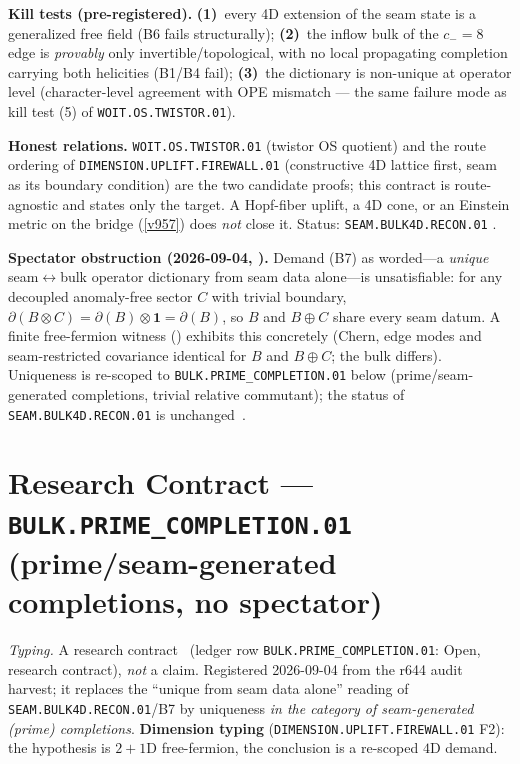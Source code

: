 \documentclass[11pt,a4paper]{article}
\begin{document}
\par\smallskip\noindent\textbf{Kill tests (pre-registered).}
\textbf{(1)}~every 4D extension of the seam state is a generalized free field (B6 fails
structurally); \textbf{(2)}~the inflow bulk of the $c_-{=}8$ edge is \emph{provably} only
invertible/topological, with no local propagating completion carrying both helicities (B1/B4
fail); \textbf{(3)}~the dictionary is non-unique at operator level (character-level agreement
with OPE mismatch --- the same failure mode as kill test (5) of \texttt{WOIT.OS.TWISTOR.01}).

\par\smallskip\noindent\textbf{Honest relations.} \texttt{WOIT.OS.TWISTOR.01} (twistor OS
quotient) and the route ordering of \texttt{DIMENSION.UPLIFT.FIREWALL.01} (constructive 4D
lattice first, seam as its boundary condition) are the two candidate proofs; this contract is
route-agnostic and states only the target.  A Hopf-fiber uplift, a 4D cone, or an Einstein
metric on the bridge (\vref{v957}) does \emph{not} close it.  Status:
\texttt{SEAM.BULK4D.RECON.01} \mO.

\par\smallskip\noindent\textbf{Spectator obstruction (2026-09-04, ).}
Demand (B7) as worded---a \emph{unique} seam$\leftrightarrow$bulk operator dictionary from seam data
alone---is unsatisfiable: for any decoupled anomaly-free sector $C$ with trivial boundary,
$\partial(B\otimes C)=\partial(B)\otimes\mathbf 1=\partial(B)$, so $B$ and $B\oplus C$ share every
seam datum.  A finite free-fermion witness ()
exhibits this concretely (Chern, edge modes and seam-restricted covariance identical for $B$ and
$B\oplus C$; the bulk differs).  Uniqueness is re-scoped to
\texttt{BULK.PRIME\_COMPLETION.01} below (prime/seam-generated completions, trivial
relative commutant); the status of \texttt{SEAM.BULK4D.RECON.01} is unchanged~\mO.

\section*{Research Contract --- \texttt{BULK.PRIME\_COMPLETION.01} (prime/seam-generated completions, no spectator)}
\noindent\emph{Typing.} A research contract \mO\ (ledger row
\texttt{BULK.PRIME\_COMPLETION.01}: Open, research contract), \emph{not} a claim.
Registered 2026-09-04 from the r644 audit harvest; it replaces the ``unique from seam
data alone'' reading of \texttt{SEAM.BULK4D.RECON.01}/B7 by uniqueness \emph{in the
category of seam-generated (prime) completions}.  \textbf{Dimension typing}
(\texttt{DIMENSION.UPLIFT.FIREWALL.01} F2): the hypothesis is $2{+}1$D free-fermion,
the conclusion is a re-scoped $4$D demand.
\end{document}
